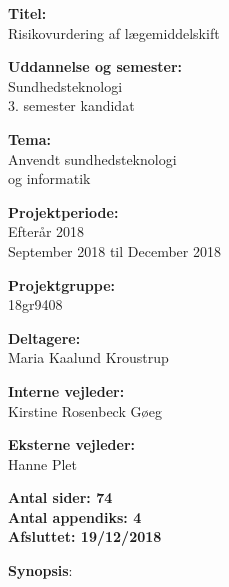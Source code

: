 \begin{minipage}[t]{0.48\textwidth}
\textbf{Titel:} \\[5pt]\bigskip\hspace{2ex}
Risikovurdering af lægemiddelskift

\textbf{Uddannelse og semester:} \\[5pt]\bigskip\hspace{2ex}
Sundhedsteknologi \\ \bigskip\hspace{2ex} 3. semester kandidat

\textbf{Tema:} \\[5pt]\bigskip\hspace{2ex}
Anvendt sundhedsteknologi \\ \bigskip\hspace{2ex}
og informatik

\vspace*{2mm}

\textbf{Projektperiode:} \\[5pt]\bigskip\hspace{2ex}
Efterår 2018  \\ \bigskip\hspace{2ex} September 2018 til December 2018

\textbf{Projektgruppe:} \\[5pt]\bigskip\hspace{2ex}
18gr9408

\textbf{Deltagere:} \\[5pt]\hspace*{2ex}
Maria Kaalund Kroustrup

\vspace*{5mm}

\textbf{Interne vejleder:} \\[5pt]\hspace*{2ex}
Kirstine Rosenbeck Gøeg 

\vspace*{2mm}

\textbf{Eksterne vejleder:} \\[5pt]\hspace*{2ex}
Hanne Plet\\\bigskip\hspace{2ex}


\textbf{Antal sider: 74} \\
\textbf{Antal appendiks: 4} \\ 
\textbf{Afsluttet: 19/12/2018}

\end{minipage}
\hfill
\begin{minipage}[t]{0.483\textwidth}
\textbf{Synopsis}: \\[5pt]
\fbox{\parbox{7cm}{\bigskip\bigskip}}
\end{minipage}

